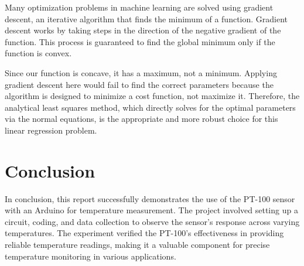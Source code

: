 \documentclass{article}
\begin{document}
	Many optimization problems in machine learning are solved using gradient descent, an iterative algorithm that finds the minimum of a function. Gradient descent works by taking steps in the direction of the negative gradient of the function. This process is guaranteed to find the global minimum only if the function is convex.
	
	Since our function is concave, it has a maximum, not a minimum. Applying gradient descent here would fail to find the correct parameters because the algorithm is designed to minimize a cost function, not maximize it. Therefore, the analytical least squares method, which directly solves for the optimal parameters via the normal equations, is the appropriate and more robust choice for this linear regression problem.
	
	\section{Conclusion}
	In conclusion, this report successfully demonstrates the use of the PT-100 sensor with an Arduino for temperature measurement. The project involved setting up a circuit, coding, and data collection to observe the sensor's response across varying temperatures. The experiment verified the PT-100's effectiveness in providing reliable temperature readings, making it a valuable component for precise temperature monitoring in various applications.
	
\end{document}
